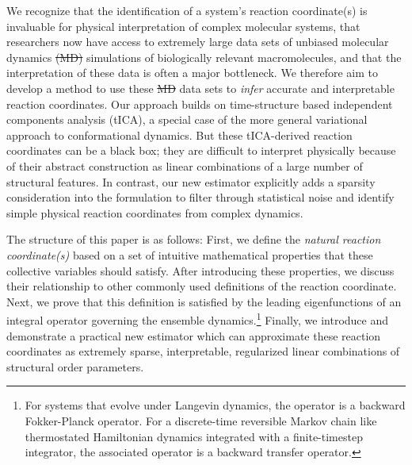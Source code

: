 \documentclass[aip, jcp, reprint, nolinenumbers, twocolumn, nobalancelastpage]{revtex4-1} %
\providecommand{\DIFaddtex}[1]{{\protect\color{blue}\uwave{#1}}} %
\providecommand{\DIFdeltex}[1]{{\protect\color{red}\sout{#1}}}                      %
\providecommand{\DIFaddbegin}{} %
\providecommand{\DIFaddend}{} %
\providecommand{\DIFdelbegin}{} %
\providecommand{\DIFdelend}{} %
\providecommand{\DIFadd}[1]{\texorpdfstring{\DIFaddtex{#1}}{#1}} %
\providecommand{\DIFdel}[1]{\texorpdfstring{\DIFdeltex{#1}}{}} %
\begin{document}

We recognize that the identification of a system's reaction coordinate(s) is invaluable for physical interpretation of complex molecular systems, that researchers now have access to extremely large data sets of unbiased molecular dynamics \DIFdelbegin \DIFdel{(MD) }\DIFdelend simulations of biologically relevant macromolecules, and that the interpretation of these data is often a major bottleneck.\cite{lane2013milliseconds} We therefore aim to develop a method to use these \DIFdelbegin \DIFdel{MD }\DIFdelend \DIFaddbegin \DIFadd{molecular dynamics }\DIFaddend data sets to \emph{infer} accurate and interpretable reaction coordinates. Our approach builds on time-structure based independent components analysis (tICA), a special case of the more general variational approach to conformational dynamics.\cite{schwantes2013improvements, perez2013identification} But these tICA-derived reaction coordinates can be a black box; they are difficult to interpret physically because of their abstract construction as linear combinations of a large number of structural features. In contrast, our new estimator explicitly adds a sparsity consideration into the formulation to filter through statistical noise and identify simple physical reaction coordinates from complex dynamics.

The structure of this paper is as follows: First, we define the \emph{natural reaction coordinate(s)} based on a set of intuitive mathematical properties that these collective variables should satisfy. After introducing these properties, we discuss their relationship to other commonly used definitions of the reaction coordinate. Next, we prove that this definition is satisfied by the leading eigenfunctions of an integral operator governing the ensemble dynamics.\footnote{For systems that evolve under Langevin dynamics, the operator is a backward Fokker-Planck operator.\cite{coifman2008diffusion} For a discrete-time reversible Markov chain like thermostated Hamiltonian dynamics integrated with a finite-timestep integrator, the associated operator is a backward transfer operator.\cite{schutte2001transfer}} Finally, we introduce and demonstrate a practical new estimator which can approximate these reaction coordinates as extremely sparse, interpretable, regularized linear combinations of structural order parameters.
\end{document}
